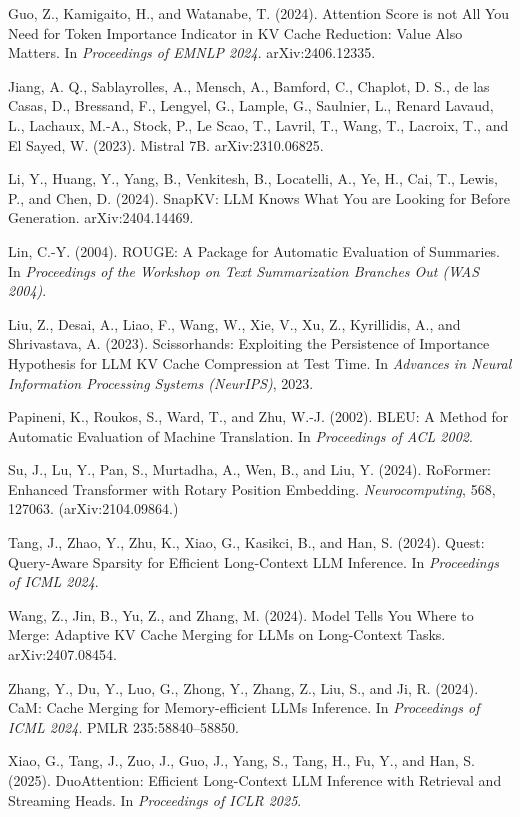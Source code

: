 \documentclass[10pt,letterpaper]{article}
\begin{document}
Guo, Z., Kamigaito, H., and Watanabe, T. (2024). Attention Score is not
All You Need for Token Importance Indicator in KV Cache Reduction: Value
Also Matters. In \emph{Proceedings of EMNLP 2024}. arXiv:2406.12335.

Jiang, A. Q., Sablayrolles, A., Mensch, A., Bamford, C., Chaplot, D. S.,
de las Casas, D., Bressand, F., Lengyel, G., Lample, G., Saulnier, L.,
Renard Lavaud, L., Lachaux, M.-A., Stock, P., Le Scao, T., Lavril, T.,
Wang, T., Lacroix, T., and El Sayed, W. (2023). Mistral 7B.
arXiv:2310.06825.

Li, Y., Huang, Y., Yang, B., Venkitesh, B., Locatelli, A., Ye, H., Cai,
T., Lewis, P., and Chen, D. (2024). SnapKV: LLM Knows What You are
Looking for Before Generation. arXiv:2404.14469.

Lin, C.-Y. (2004). ROUGE: A Package for Automatic Evaluation of
Summaries. In \emph{Proceedings of the Workshop on Text Summarization
Branches Out (WAS 2004)}.

Liu, Z., Desai, A., Liao, F., Wang, W., Xie, V., Xu, Z., Kyrillidis, A.,
and Shrivastava, A. (2023). Scissorhands: Exploiting the Persistence of
Importance Hypothesis for LLM KV Cache Compression at Test Time. In
\emph{Advances in Neural Information Processing Systems (NeurIPS)},
2023.

Papineni, K., Roukos, S., Ward, T., and Zhu, W.-J. (2002). BLEU: A
Method for Automatic Evaluation of Machine Translation. In
\emph{Proceedings of ACL 2002}.

Su, J., Lu, Y., Pan, S., Murtadha, A., Wen, B., and Liu, Y. (2024).
RoFormer: Enhanced Transformer with Rotary Position Embedding.
\emph{Neurocomputing}, 568, 127063. (arXiv:2104.09864.)

Tang, J., Zhao, Y., Zhu, K., Xiao, G., Kasikci, B., and Han, S. (2024).
Quest: Query-Aware Sparsity for Efficient Long-Context LLM Inference. In
\emph{Proceedings of ICML 2024}.

Wang, Z., Jin, B., Yu, Z., and Zhang, M. (2024). Model Tells You Where
to Merge: Adaptive KV Cache Merging for LLMs on Long-Context Tasks.
arXiv:2407.08454.

Zhang, Y., Du, Y., Luo, G., Zhong, Y., Zhang, Z., Liu, S., and Ji, R.
(2024). CaM: Cache Merging for Memory-efficient LLMs Inference. In
\emph{Proceedings of ICML 2024}. PMLR 235:58840--58850.

Xiao, G., Tang, J., Zuo, J., Guo, J., Yang, S., Tang, H., Fu, Y., and
Han, S. (2025). DuoAttention: Efficient Long-Context LLM Inference with
Retrieval and Streaming Heads. In \emph{Proceedings of ICLR 2025}.
\end{document}
